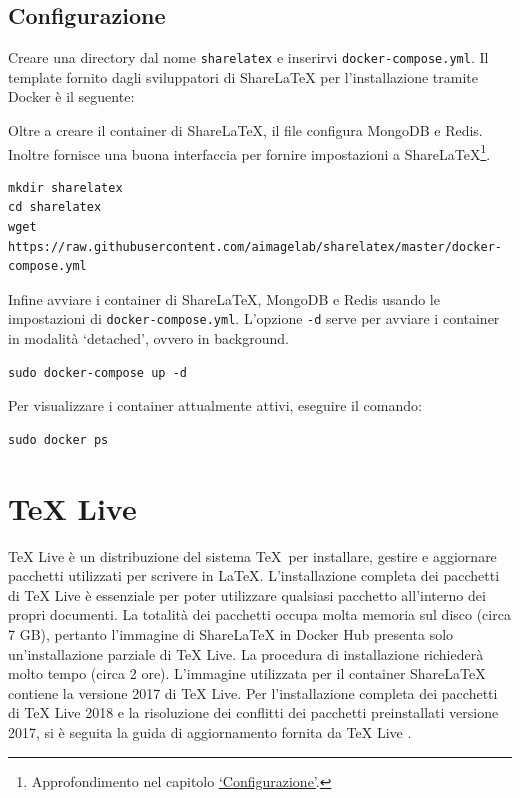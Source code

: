 \subsection{Configurazione}
Creare una directory dal nome \verb|sharelatex| e inserirvi \verb|docker-compose.yml|. Il template fornito dagli sviluppatori di ShareLaTeX per l'installazione tramite Docker è il seguente:

Oltre a creare il container di ShareLaTeX, il file configura MongoDB e Redis. Inoltre fornisce una buona interfaccia per fornire impostazioni a ShareLaTeX\footnote{Approfondimento nel capitolo \hyperref[Configurazione]{\enquote*{Configurazione}}.}.
\begin{lstlisting}
mkdir sharelatex
cd sharelatex
wget https://raw.githubusercontent.com/aimagelab/sharelatex/master/docker-compose.yml
\end{lstlisting}
Infine avviare i container di ShareLaTeX, MongoDB e Redis usando le impostazioni di \verb|docker-compose.yml|. L'opzione \verb|-d| serve per avviare i container in modalità \enquote*{detached}, ovvero in background.
\begin{lstlisting}
sudo docker-compose up -d
\end{lstlisting}
Per visualizzare i container attualmente attivi, eseguire il comando:
\begin{lstlisting}
sudo docker ps
\end{lstlisting}

\section{TeX Live}
TeX Live è un distribuzione del sistema \TeX ~per installare, gestire e aggiornare pacchetti utilizzati per scrivere in \LaTeX. L'installazione completa dei pacchetti di TeX Live è essenziale per poter utilizzare qualsiasi pacchetto all'interno dei propri documenti. La totalità dei pacchetti occupa molta memoria sul disco (circa 7 GB), pertanto l'immagine di ShareLaTeX in Docker Hub presenta solo un'installazione parziale di TeX Live. La procedura di installazione richiederà molto tempo (circa 2 ore). L'immagine utilizzata per il container ShareLaTeX contiene la versione 2017 di TeX Live. Per l'installazione completa dei pacchetti di TeX Live 2018 e la risoluzione dei conflitti dei pacchetti preinstallati versione 2017, si è seguita la guida di aggiornamento fornita da TeX Live \cite{texlive_upgrade}.


